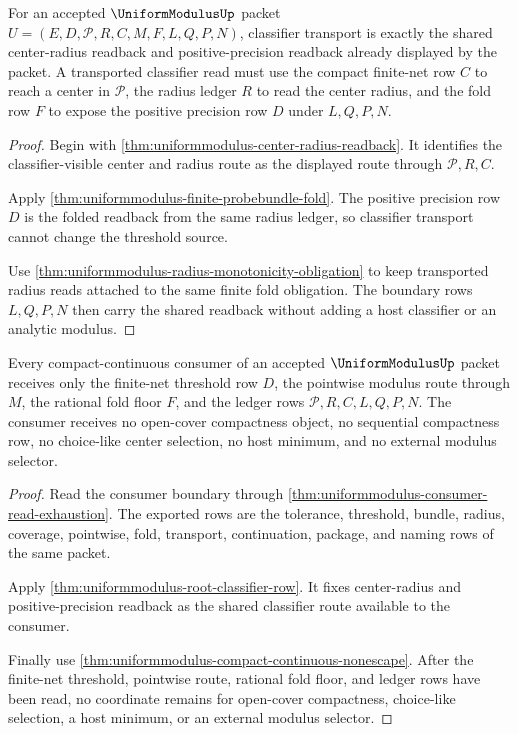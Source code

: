\begin{theorem}
\label{thm:uniformmodulus-root-classifier-row}
For an accepted $\UniformModulusUp$ packet $U=(E,D,\mathcal{P},R,C,M,F,L,Q,P,N)$, classifier transport is exactly the shared center-radius readback and positive-precision readback already displayed by the packet. A transported classifier read must use the compact finite-net row $C$ to reach a center in $\mathcal{P}$, the radius ledger $R$ to read the center radius, and the fold row $F$ to expose the positive precision row $D$ under $L,Q,P,N$.
\end{theorem}
\begin{proof}
Begin with \autoref{thm:uniformmodulus-center-radius-readback}. It identifies the classifier-visible center and radius route as the displayed route through $\mathcal{P},R,C$.

Apply \autoref{thm:uniformmodulus-finite-probebundle-fold}. The positive precision row $D$ is the folded readback from the same radius ledger, so classifier transport cannot change the threshold source.

Use \autoref{thm:uniformmodulus-radius-monotonicity-obligation} to keep transported radius reads attached to the same finite fold obligation. The boundary rows $L,Q,P,N$ then carry the shared readback without adding a host classifier or an analytic modulus.
\end{proof}

\begin{theorem}
\label{thm:uniformmodulus-root-consumer-threshold-row}
Every compact-continuous consumer of an accepted $\UniformModulusUp$ packet receives only the finite-net threshold row $D$, the pointwise modulus route through $M$, the rational fold floor $F$, and the ledger rows $\mathcal{P},R,C,L,Q,P,N$. The consumer receives no open-cover compactness object, no sequential compactness row, no choice-like center selection, no host minimum, and no external modulus selector.
\end{theorem}
\begin{proof}
Read the consumer boundary through \autoref{thm:uniformmodulus-consumer-read-exhaustion}. The exported rows are the tolerance, threshold, bundle, radius, coverage, pointwise, fold, transport, continuation, package, and naming rows of the same packet.

Apply \autoref{thm:uniformmodulus-root-classifier-row}. It fixes center-radius and positive-precision readback as the shared classifier route available to the consumer.

Finally use \autoref{thm:uniformmodulus-compact-continuous-nonescape}. After the finite-net threshold, pointwise route, rational fold floor, and ledger rows have been read, no coordinate remains for open-cover compactness, choice-like selection, a host minimum, or an external modulus selector.
\end{proof}

